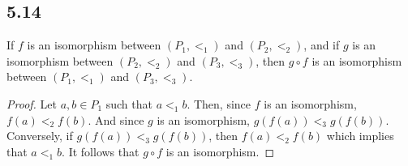 \subsection*{5.14} If $f$ is an isomorphism between $(P_1, <_1)$ and $(P_2, <_2)$, and if $g$ is an isomorphism between $(P_2, <_2)$ and $(P_3, <_3)$, then $g \circ f$ is an isomorphism between $(P_1, <_1)$ and $(P_3, <_3)$.

\begin{proof}
Let $a,b \in P_1$ such that $a <_1 b$. Then, since $f$ is an isomorphism, $f(a) <_2 f(b)$. And since $g$ is an isomorphism, $g(f(a)) <_3 g(f(b))$.
Conversely, if $g(f(a)) <_3 g(f(b))$, then $f(a) <_2 f(b)$ which implies that $a <_1 b$. It follows that $g \circ f$ is an isomorphism.
\end{proof}
